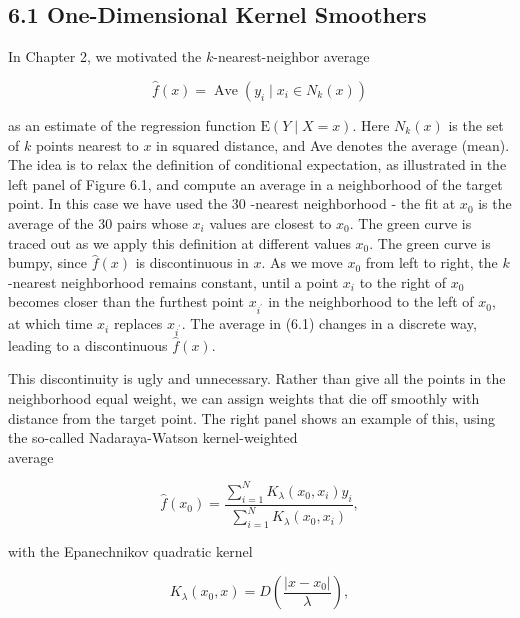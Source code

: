 \documentclass[10pt]{article}
\begin{document}
\subsection*{6.1 One-Dimensional Kernel Smoothers}
In Chapter 2, we motivated the $k$-nearest-neighbor average


\begin{equation*}
\hat{f}(x)=\operatorname{Ave}\left(y_{i} \mid x_{i} \in N_{k}(x)\right) \tag{6.1}
\end{equation*}


as an estimate of the regression function $\mathrm{E}(Y \mid X=x)$. Here $N_{k}(x)$ is the set of $k$ points nearest to $x$ in squared distance, and Ave denotes the average (mean). The idea is to relax the definition of conditional expectation, as illustrated in the left panel of Figure 6.1, and compute an average in a neighborhood of the target point. In this case we have used the 30 -nearest neighborhood - the fit at $x_{0}$ is the average of the 30 pairs whose $x_{i}$ values are closest to $x_{0}$. The green curve is traced out as we apply this definition at different values $x_{0}$. The green curve is bumpy, since $\hat{f}(x)$ is discontinuous in $x$. As we move $x_{0}$ from left to right, the $k$-nearest neighborhood remains constant, until a point $x_{i}$ to the right of $x_{0}$ becomes closer than the furthest point $x_{i^{\prime}}$ in the neighborhood to the left of $x_{0}$, at which time $x_{i}$ replaces $x_{i^{\prime}}$. The average in (6.1) changes in a discrete way, leading to a discontinuous $\hat{f}(x)$.

This discontinuity is ugly and unnecessary. Rather than give all the points in the neighborhood equal weight, we can assign weights that die off smoothly with distance from the target point. The right panel shows an example of this, using the so-called Nadaraya-Watson kernel-weighted\\
average


\begin{equation*}
\hat{f}\left(x_{0}\right)=\frac{\sum_{i=1}^{N} K_{\lambda}\left(x_{0}, x_{i}\right) y_{i}}{\sum_{i=1}^{N} K_{\lambda}\left(x_{0}, x_{i}\right)}, \tag{6.2}
\end{equation*}


with the Epanechnikov quadratic kernel


\begin{equation*}
K_{\lambda}\left(x_{0}, x\right)=D\left(\frac{\left|x-x_{0}\right|}{\lambda}\right), \tag{6.3}
\end{equation*}
\end{document}
